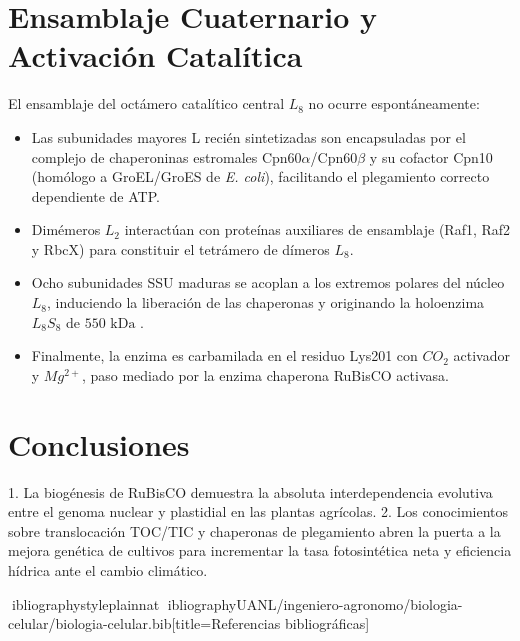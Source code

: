 \documentclass[spanish,letterpaper,oneside]{article}
\begin{document}
\section{Ensamblaje Cuaternario y Activación Catalítica}
El ensamblaje del octámero catalítico central $L_8$ no ocurre espontáneamente:
\begin{itemize}
    \item Las subunidades mayores L recién sintetizadas son encapsuladas por el complejo de chaperoninas estromales Cpn60$\alpha$/Cpn60$\beta$ y su cofactor Cpn10 (homólogo a GroEL/GroES de \textit{E. coli}), facilitando el plegamiento correcto dependiente de ATP.
    \item Dimémeros $L_2$ interactúan con proteínas auxiliares de ensamblaje (Raf1, Raf2 y RbcX) para constituir el tetrámero de dímeros $L_8$.
    \item Ocho subunidades SSU maduras se acoplan a los extremos polares del núcleo $L_8$, induciendo la liberación de las chaperonas y originando la holoenzima $L_8S_8$ de $550\text{ kDa}$ \parencite{taiz2015}.
    \item Finalmente, la enzima es carbamilada en el residuo Lys201 con $CO_2$ activador y $Mg^{2+}$, paso mediado por la enzima chaperona RuBisCO activasa.
\end{itemize}

\section{Conclusiones}
1. La biogénesis de RuBisCO demuestra la absoluta interdependencia evolutiva entre el genoma nuclear y plastidial en las plantas agrícolas.
2. Los conocimientos sobre translocación TOC/TIC y chaperonas de plegamiento abren la puerta a la mejora genética de cultivos para incrementar la tasa fotosintética neta y eficiencia hídrica ante el cambio climático.

\newpage
ibliographystyle{plainnat}
ibliography{UANL/ingeniero-agronomo/biologia-celular/biologia-celular.bib}[title={Referencias bibliográficas}]
\end{document}
